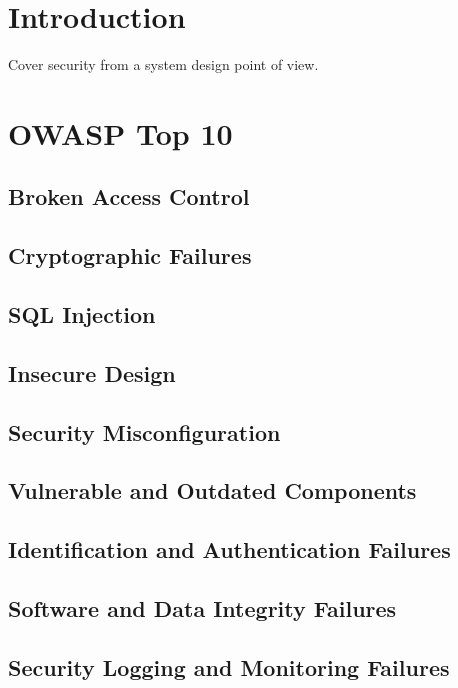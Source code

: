 \documentclass[a4paper, 11pt]{book}
\begin{document}
    \section{Introduction}
    Cover security from a system design point of view.


    \section{OWASP Top 10}

    \subsection{Broken Access Control}

    \subsection{Cryptographic Failures}

    \subsection{SQL Injection}

    \subsection{Insecure Design}

    \subsection{Security Misconfiguration}

    \subsection{Vulnerable and Outdated Components}

    \subsection{Identification and Authentication Failures}

    \subsection{Software and Data Integrity Failures}

    \subsection{Security Logging and Monitoring Failures}
\end{document}
